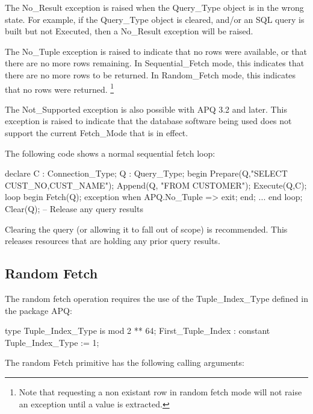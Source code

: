 \documentclass[english,letterpaper]{book}
\newcommand\apqversion{3.2}
\begin{document}
The No\_Result exception is raised when the Query\_Type
object is in the wrong state. For example, if the Query\_Type
object is cleared, and/or an SQL query is built but not Executed,
then a No\_Result exception will be raised.

The No\_Tuple exception is raised to indicate that no rows
were available, or that there are no more rows remaining. In Sequential\_Fetch
mode, this indicates that there are no more rows to be returned. In
Random\_Fetch mode, this indicates that no rows were returned.%
\footnote{Note that requesting a non existant row in random fetch mode will
not raise an exception until a value is extracted.%
}

The Not\_Supported exception is also possible with APQ \apqversion
and later. This exception is raised to indicate that the database
software being used does not support the current Fetch\_Mode that
is in effect.

The following code shows a normal sequential fetch loop:\label{Sequential Fetch Example}

\begin{Example}
declare
   C : Connection_Type;
   Q : Query_Type;
begin
   Prepare(Q,"SELECT CUST_NO,CUST_NAME");
   Append(Q, "FROM CUSTOMER");
   Execute(Q,C);
   loop
      begin
         Fetch(Q);
      exception
         when APQ.No_Tuple =>
            exit;
      end;
      ...
   end loop;
   Clear(Q); -- Release any query results
\end{Example}

Clearing the query (or allowing it to fall out of scope) is recommended.
This releases resources that are
holding any prior query results.


\subsection{Random Fetch}

The random fetch operation requires the use of the Tuple\_Index\_Type
defined in the package APQ:

\begin{Code}
type Tuple_Index_Type is mod 2 ** 64;
First_Tuple_Index : constant Tuple_Index_Type := 1;
\end{Code}

The random Fetch primitive has the following calling arguments:
\end{document}
